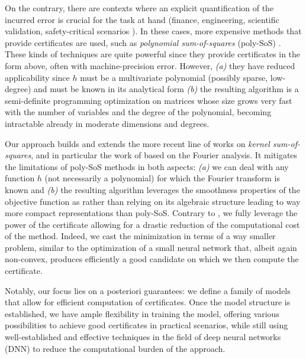 \documentclass{article}
\begin{document}
On the contrary, there are contexts where an explicit quantification of the incurred error is crucial for the task at hand (finance, engineering, scientific validation, safety-critical scenarios \cite{lasserreMomentsPositivePolynomials2009}). In these cases, more expensive methods that provide certificates are used, such as {\em polynomial sum-of-squares} (poly-SoS) \cite{lasserreGlobalOptimizationPolynomials2001,lasserreMomentsPositivePolynomials2009}. These kinds of techniques are quite powerful since they provide certificates in the form above, often with machine-precision error. However, \emph{(a)} they have reduced applicability since $h$ must be a multivariate polynomial (possibly sparse, low-degree) and must be known in its analytical form \emph{(b)} the resulting algorithm is a semi-definite programming optimization on matrices whose size grows very fast with the number of variables and the degree of the polynomial, becoming intractable already in moderate dimensions and degrees.

Our approach builds and extends the more recent line of works on {\em kernel sum-of-squares}, and in particular the work of \citet{woodworthNonConvexOptimizationCertificates2022} based on the Fourier analysis. It mitigates the limitations of poly-SoS methods in both aspects: \emph{(a)} we can deal with any function $h$ (not necessarily a polynomial) for which the Fourier transform is known and \emph{(b)} the resulting algorithm leverages the smoothness properties of the objective function as \cite{woodworthNonConvexOptimizationCertificates2022} rather than relying on its algebraic structure leading to way more compact representations than poly-SoS. Contrary to \cite{woodworthNonConvexOptimizationCertificates2022}, we fully leverage the power of the certificate allowing for a drastic reduction of the computational cost of the method. Indeed, we cast the minimization in terms of a way smaller problem, similar to the optimization of a small neural network that, albeit again non-convex, produces efficiently a good candidate on which we then compute the certificate.

Notably, our focus lies on a posteriori guarantees: we define a family of models that allow for efficient computation of certificates. Once the model structure is established, we have ample flexibility in training the model, offering various possibilities to achieve good certificates in practical scenarios, while still using well-established and effective techniques in the field of deep neural networks (DNN) \cite{goodfellow2016deep} to reduce the computational burden of the approach.
\end{document}

